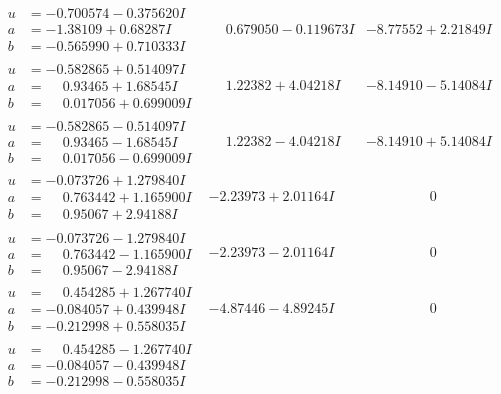 \documentclass[1p]{elsarticle_modified}
\theoremstyle{definition}
\begin{document}
$$\begin{array}{c|c|c}
\begin{aligned}
u &= -0.700574 - 0.375620 I \\
a &= -1.38109 + 0.68287 I \\
b &= -0.565990 + 0.710333 I\end{aligned}
 & \phantom{-}0.679050 - 0.119673 I & -8.77552 + 2.21849 I \\ \hline\begin{aligned}
u &= -0.582865 + 0.514097 I \\
a &= \phantom{-}0.93465 + 1.68545 I \\
b &= \phantom{-}0.017056 + 0.699009 I\end{aligned}
 & \phantom{-}1.22382 + 4.04218 I & -8.14910 - 5.14084 I \\ \hline\begin{aligned}
u &= -0.582865 - 0.514097 I \\
a &= \phantom{-}0.93465 - 1.68545 I \\
b &= \phantom{-}0.017056 - 0.699009 I\end{aligned}
 & \phantom{-}1.22382 - 4.04218 I & -8.14910 + 5.14084 I \\ \hline\begin{aligned}
u &= -0.073726 + 1.279840 I \\
a &= \phantom{-}0.763442 + 1.165900 I \\
b &= \phantom{-}0.95067 + 2.94188 I\end{aligned}
 & -2.23973 + 2.01164 I & \phantom{-0.000000 } 0 \\ \hline\begin{aligned}
u &= -0.073726 - 1.279840 I \\
a &= \phantom{-}0.763442 - 1.165900 I \\
b &= \phantom{-}0.95067 - 2.94188 I\end{aligned}
 & -2.23973 - 2.01164 I & \phantom{-0.000000 } 0 \\ \hline\begin{aligned}
u &= \phantom{-}0.454285 + 1.267740 I \\
a &= -0.084057 + 0.439948 I \\
b &= -0.212998 + 0.558035 I\end{aligned}
 & -4.87446 - 4.89245 I & \phantom{-0.000000 } 0 \\ \hline\begin{aligned}
u &= \phantom{-}0.454285 - 1.267740 I \\
a &= -0.084057 - 0.439948 I \\
b &= -0.212998 - 0.558035 I\end{aligned}

\end{array}$$
\end{document}
